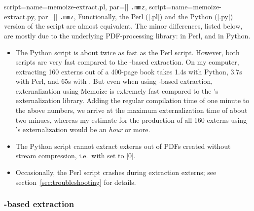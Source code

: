 \documentclass[a4paper,11pt]{article}
\begin{document}
\begin{doc}{
    script={name=memoize-extract.pl, par=[] \texttt{.mmz}},
    script={name=memoize-extract.py, par=[] \texttt{.mmz}},
  }
  Functionally, the Perl (|.pl|) and the Python (|.py|) version of the script
  are almost equivalent.  The minor differences, listed below, are mostly due
  to the underlying PDF-processing library:
   in Perl, and
   in Python.
  \begin{itemize}
  \item The Python script is about twice as fast as the Perl script.  However,
    both scripts are very fast compared to the -based extraction.
    On my computer, extracting 160 externs out of a 400-page book takes 1.4s
    with Python, 3.7s with Perl, and 65s with .  But even when
    using -based extraction, externalization using Memoize is
    extremely fast compared to the \TikZ's externalization library.  Adding
    the regular compilation time of one minute to the above numbers, we arrive
    at the maximum externalization time of about two minues, whereas my
    estimate for the production of all 160 externs using \TikZ's
    externalization would be an \emph{hour} or more.
  \item The Python script cannot extract externs out of PDFs created without
    stream compression, i.e.\ with 
     set to |0|.
  \item Occasionally, the Perl script crashes during extraction externs; see
    section~\ref{sec:troubleshooting} for details.
  \end{itemize}
\end{doc}

\subsubsection{\texorpdfstring{}{TeX}-based extraction}
\label{sec:ref:extraction-tex}
\end{document}
